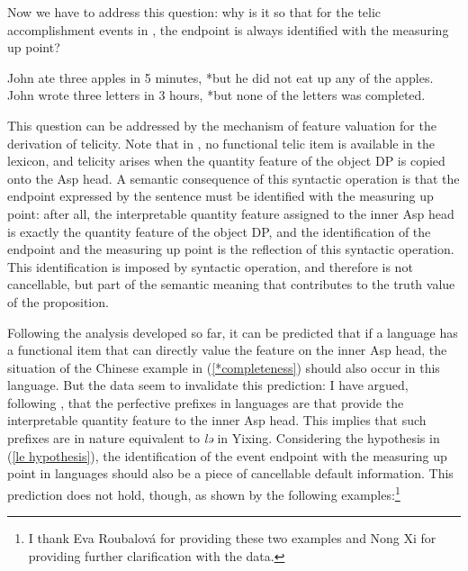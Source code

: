 \documentclass[output=paper]{langsci/langscibook}
\begin{document}
Now we have to address this question: why is it so that for the telic accomplishment events in , the endpoint is always identified with the measuring up point?

\begin{exe}
\ex John ate three apples in 5 minutes, *but he did not eat up any of the apples.
\ex John wrote three letters in 3 hours, *but none of the letters was completed.
\end{exe}

This question can be addressed by the mechanism of feature valuation for the derivation of telicity. Note that in , no functional telic item is available in the lexicon, and telicity arises when the quantity feature of the object DP is copied onto the Asp head. A semantic consequence of this syntactic operation is that the endpoint expressed by the sentence must be identified with the measuring up point: after all, the interpretable quantity feature assigned to the inner Asp head is exactly the quantity feature of the object DP, and the identification of the endpoint and the measuring up point is the reflection of this syntactic operation. This identification is imposed by syntactic operation, and therefore is not cancellable, but part of the semantic meaning that contributes to the truth value of the proposition.


Following the analysis developed so far, it can be predicted that if a language
has a functional item that can directly value the feature on the inner
Asp head, the situation of the Chinese example in (\ref{*completeness})
should also occur in this language. But the  data seem to invalidate this
prediction: I have argued, following \textcite{Borer2005b}, that the perfective
prefixes in  languages are  that provide the
interpretable quantity feature to the inner Asp head. This implies that
such prefixes are in nature equivalent to \emph{lə} in Yixing. Considering the
hypothesis in (\ref{le hypothesis}), the identification of the event endpoint
with the measuring up point in  languages should also be a piece of
cancellable default information. This prediction does not hold, though, as
shown by the following  examples:\footnote{I thank Eva Roubalov\'a for
providing these two examples and Nong Xi for providing further clarification
with the data.}\largerpage[-1]
\end{document}
